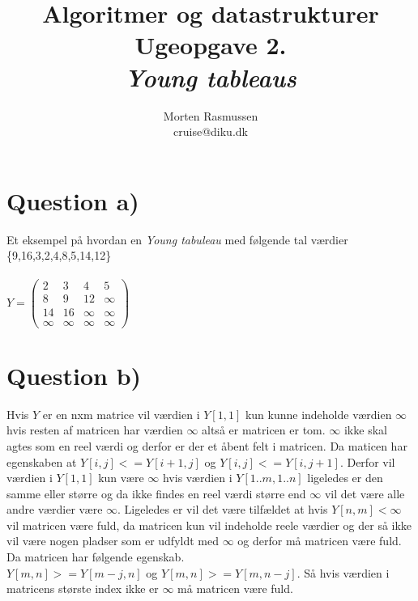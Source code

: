 \documentclass[a4paper, 12pt]{article}
\begin{document}
\title{
\Huge Algoritmer og datastrukturer\\
\LARGE Ugeopgave 2.\\
\Large \emph{Young tableaus}
}
\author{Morten Rasmussen \\ cruise@diku.dk}
\maketitle
\newpage

\section*{Question a)}
Et eksempel på hvordan en \emph{Young tabuleau} med følgende tal værdier\\
\{9,16,3,2,4,8,5,14,12\}\\\\
$ Y = 
\begin{pmatrix}
2 & 3 & 4 & 5 \\
8 & 9 & 12 & \infty \\
14 & 16 & \infty & \infty \\
\infty & \infty & \infty & \infty
\end{pmatrix}
$

\section*{Question b)}
Hvis $Y$ er en nxm matrice vil værdien i $Y[1,1]$ kun kunne indeholde værdien $\infty$ hvis resten af matricen
har værdien $\infty$ altså er matricen er tom. 
$\infty$ ikke skal agtes som en reel værdi og derfor er der et åbent felt i matricen.
Da maticen har egenskaben at $Y[i,j] <= Y[i+1,j]$ og $Y[i,j] <= Y[i,j+1]$.
Derfor vil værdien i $Y[1,1]$ kun være $\infty$ hvis værdien i $Y[1 .. m,1 .. n]$ ligeledes
er den samme eller større og da ikke findes en reel værdi større end $\infty$ vil det være alle
andre værdier være $\infty$.
Ligeledes er vil det være tilfældet at hvis $Y[n,m] < \infty$ vil matricen være fuld, da
matricen kun vil indeholde reele værdier og der så ikke vil være nogen pladser som er udfyldt med
$\infty$ og derfor må matricen være fuld. Da matricen har følgende egenskab.\\
$Y[m,n] >= Y[m-j,n]$ og $Y[m,n] >= Y[m,n-j]$. Så hvis værdien i matricens største index ikke er
$\infty$ må matricen være fuld.
\end{document}
